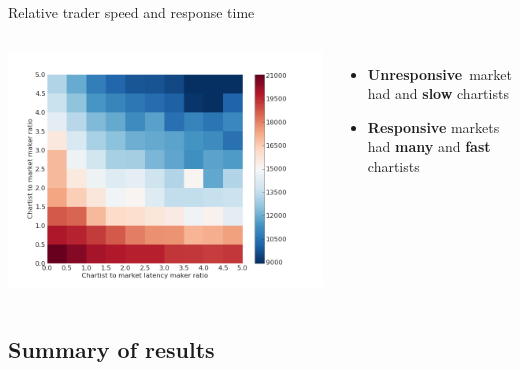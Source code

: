 \documentclass[14pt]{beamer}
\begin{document}

\begin{frame}{Relative trader speed and response time}
\begin{columns}
\column{1.7in}
\includegraphics[width=1.5\textwidth]{ratio/time_to_reach_new_fundamental.png}
\column{1.7in}
\begin{itemize}
\item \color{red} \textbf{Unresponsive}\color{black}\ market had  and \textbf{slow} chartists
\item \color{blue} \textbf{Responsive} \color{black} markets had \textbf{many} and \textbf{fast} chartists
\end{itemize}
\end{columns}
\end{frame}

\subsection{Summary of results}
\begin{frame}
\tableofcontents[currentsubsection]
\end{frame}
\end{document}
